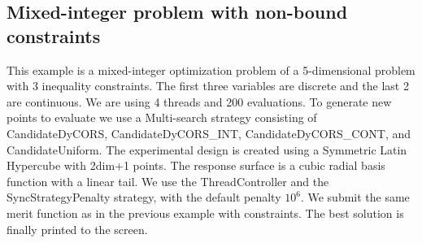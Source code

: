 \documentclass[]{article}
\begin{document}
\subsection{Mixed-integer problem with non-bound constraints}
This example is a mixed-integer optimization problem of a 5-dimensional problem with 3 inequality constraints. The first three variables are discrete and the last 2 are continuous. We are using 4 threads and 200 evaluations. To generate new points to evaluate we use a Multi-search strategy consisting of CandidateDyCORS, CandidateDyCORS\_INT, CandidateDyCORS\_CONT, and CandidateUniform. The experimental design is created using a Symmetric Latin Hypercube with 2dim+1 points. The response surface is a cubic radial basis function with a linear tail. We use the ThreadController and the SyncStrategyPenalty strategy, with the default penalty $10^6$. We submit the same merit function as in the previous example with constraints. The best solution is finally printed to the screen.
\end{document}
